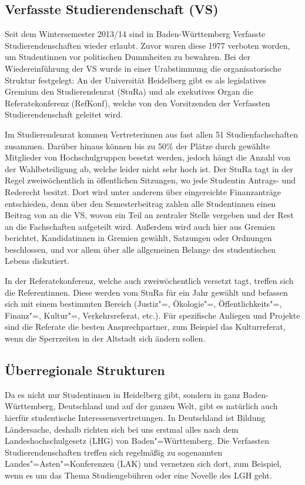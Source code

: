 \subsection{Verfasste Studierendenschaft (VS)}
Seit dem Wintersemester 2013/14 sind in Baden-Württemberg Verfasste Studierendenschaften wieder erlaubt.
Zuvor waren diese 1977 verboten worden, um Studentinnen vor politischen Dummheiten zu bewahren.
Bei der Wiedereinführung der VS wurde in einer Urabstimmung die organisatorische Struktur festgelegt:
An der Universität Heidelberg gibt es als legislatives Gremium den Studierendenrat (StuRa) und als exekutives Organ die Referatekonferenz (RefKonf), welche von den Vorsitzenden der Verfassten Studierendenschaft geleitet wird.

Im Studierendenrat kommen Vertreterinnen aus fast allen 51 Studienfachschaften zusammen.
Darüber hinaus können bis zu 50\% der Plätze durch gewählte Mitglieder von Hochschulgruppen besetzt werden, jedoch hängt die Anzahl von der Wahlbeteiligung ab, welche leider nicht sehr hoch ist.
Der StuRa tagt in der Regel zweiwöchentlich in öffentlichen Sitzungen, wo jede Studentin Antrags- und Rederecht besitzt.
Dort wird unter anderem über eingereichte Finanzanträge entschieden, denn über den Semesterbeitrag zahlen alle Studentinnen einen Beitrag von \EUR{\vsbeitrag} an die VS, wovon ein Teil an zentraler Stelle vergeben und der Rest an die Fachschaften aufgeteilt wird.
Außerdem wird auch hier aus Gremien berichtet, Kandidatinnen in Gremien gewählt, Satzungen oder Ordnungen beschlossen, und vor allem über alle allgemeinen Belange des studentischen Lebens diskutiert.

In der Referatekonferenz, welche auch zweiwöchentlich versetzt tagt, treffen sich die Referentinnen.
Diese werden vom StuRa für ein Jahr gewählt und befassen sich mit einem bestimmten Bereich (Justiz"=, Ökologie"=, Öffentlichkeits"=, Finanz"=, Kultur"=, Verkehrsreferat, etc.).
Für spezifische Anliegen und Projekte sind die Referate die besten Ansprechpartner, zum Beispiel das Kulturreferat, wenn die Sperrzeiten in der Altstadt sich ändern sollen.

\subsection{Überregionale Strukturen}
Da es nicht nur Studentinnen in Heidelberg gibt, sondern in ganz Baden-Württemberg, Deutschland und auf der ganzen Welt, gibt es natürlich auch hierfür studentische Interessensvertretungen.
In Deutschland ist Bildung Ländersache, deshalb richten sich bei uns erstmal alles nach dem Landeshochschulgesetz (LHG) von Baden"=Württemberg.
Die Verfassten Studierendenschaften treffen sich regelmäßig zu sogenannten Landes"=Asten"=Konferenzen (LAK) und vernetzen sich dort, zum Beispiel, wenn es um das Thema Studiengebühren oder eine Novelle des LGH geht.


